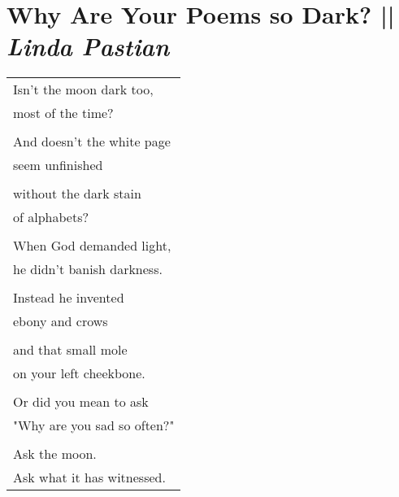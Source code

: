 
\section[Why Are Your Poems so Dark? ]{Why Are Your Poems so Dark? || \emph{Linda Pastian} \hspace*{\fill}  \thepage}
\vspace*{1cm}
\begin{center}
\begin{tabular}{l}
Isn't the moon dark too,\\
most of the time?\\
\\
And doesn't the white page\\
seem unfinished\\
\\
without the dark stain\\
of alphabets?\\
\\
When God demanded light,\\
he didn't banish darkness.\\
\\
Instead he invented\\
ebony and crows\\
\\
and that small mole\\
on your left cheekbone.\\
\\
Or did you mean to ask\\
"Why are you sad so often?"\\
\\
Ask the moon.\\
Ask what it has witnessed.
\end{tabular}
\end{center}